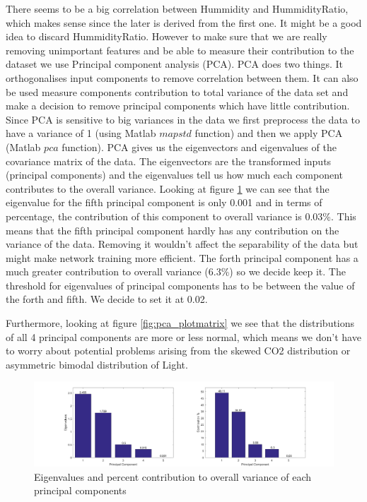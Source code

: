 \documentclass[a4paper, 11pt]{article}
\begin{document}
There seems to be a big correlation between Hummidity and HummidityRatio, which makes sense since the later is derived from the first one. It might be a good idea to discard HummidityRatio. However to make sure that we are really removing unimportant features and be able to measure their contribution to the dataset we use Principal component analysis (PCA). PCA does two things. It orthogonalises input components to remove correlation between them. It can also be used measure components contribution to total variance of the data set and make a decision to remove principal components which have little contribution. Since PCA is sensitive to big variances in the data we first preprocess the data to have a variance of 1 (using Matlab $mapstd$ function) and then we apply PCA (Matlab $pca$ function). PCA gives us the eigenvectors and eigenvalues of the covariance matrix of the data. The eigenvectors are the transformed inputs (principal components) and the eigenvalues tell us how much each component contributes to the overall variance. Looking at figure \ref{fig:eigenvalues} we can see that the eigenvalue for the fifth principal component is only 0.001 and in terms of percentage, the contribution of this component to overall variance is 0.03\%. This means that the fifth principal component hardly has any contribution on the variance of the data. Removing it wouldn't affect the separability of the data but might make network training more efficient. The forth principal component has a much greater contribution to overall variance (6.3\%) so we decide keep it. The threshold for eigenvalues of principal components has to be between the value of the forth and fifth. We decide to set it at 0.02.


Furthermore, looking at figure \ref{fig:pca_plotmatrix} we see that the distributions of all 4 principal components are more or less normal, which means we don't have to worry about potential problems arising from the skewed CO2 distribution or asymmetric bimodal distribution of Light.


\begin{figure}[h]
  	\centering
    \includegraphics[width=1\textwidth]{../figures/eigenvalues.png}
    \caption{Eigenvalues and percent contribution to overall variance of each principal components}
    \label{fig:eigenvalues}
\end{figure}
\end{document}
